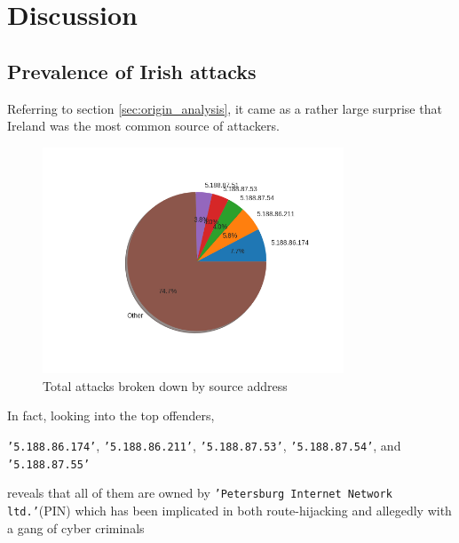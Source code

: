 \section{Discussion}
\label{sec:discussion}

\subsection{Prevalence of Irish attacks}
\label{sec:irish_analysis}

Referring to section \ref{sec:origin_analysis}, it 
came as a rather large surprise that Ireland was the most 
common source of attackers. 

\begin{figure}[H]
    \centering
    \includegraphics[width=0.8\textwidth]{src/images/ip_breakdown.png}
    \caption{Total attacks broken down by source address}
    \label{fig:attacks_by_ip}
\end{figure}


In fact, looking into the top offenders, 


\texttt{'5.188.86.174'},
\texttt{'5.188.86.211'},
\texttt{'5.188.87.53'},
\texttt{'5.188.87.54'}, and 
\texttt{'5.188.87.55'} 

reveals that all of them 
are owned by \texttt{'Petersburg 
Internet Network ltd.'}(PIN) which has been
implicated in both route-hijacking \cite{bogus_routing} 
and allegedly with a gang of cyber criminals \cite{petersburg}
